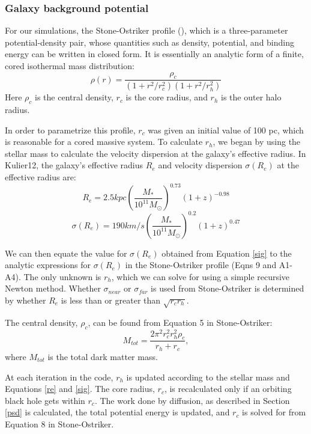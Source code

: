 \documentclass[english, apj]{emulateapj}
\begin{document}
\subsubsection{Galaxy background potential}
For our simulations, the Stone-Ostriker profile (\citet{2015ApJ...806L..28S}), which is a three-parameter potential-density pair, whose quantities such as density, potential, and binding energy can be written in closed form.  It is essentially an analytic form of a finite, cored isothermal mass distribution:
\begin{equation} \label{jerry}
\rho(r) = \frac{\rho_c}{(1+r^2/r_{c}^2)(1+r^2/r_{h}^2)}
\end{equation}
Here $\rho_c$ is the central density, $r_c$ is the core radius, and $r_h$ is the outer halo radius.

In order to parametrize this profile, $r_c$ was given an initial value of 100 pc, which is reasonable for a cored massive system.  To calculate $r_h$, we began by using the stellar mass to calculate the velocity dispersion at the galaxy's effective radius.  In Kulier12, the galaxy's effective radius $R_{e}$ and velocity dispersion $\sigma(R_e)$ at the effective radius are:
\begin{equation} \label{re}
R_{e} = 2.5 kpc\left(\frac{M_*}{10^{11}M_{\odot}}\right)^{0.73}(1+z)^{-0.98}
\end{equation}
\begin{equation} \label{sig}
\sigma(R_{e}) = 190km/s\left(\frac{M_{*}}{10^{11}M_{\odot}}\right)^{0.2}(1+z)^{0.47}
\end{equation}

We can then equate the value for $\sigma({R_e})$ obtained from Equation \ref{sig} to the analytic expressions for $\sigma(R_{e})$ in the Stone-Ostriker profile (Eqns 9 and A1-A4).  The only unknown is $r_h$, which we can solve for using a simple recursive Newton method.  Whether $\sigma_{near}$ or $\sigma_{far}$ is used from Stone-Ostriker is determined by whether $R_e$ is less than or greater than $\sqrt{r_c r_h}$.

The central density, $\rho_c$, can be found from Equation 5 in Stone-Ostriker:
\begin{equation} \label{rhoc}
M_{tot} = \frac{2\pi^2r_{c}^2r_{h}^2\rho_c}{r_h+r_c},
\end{equation}
where $M_{tot}$ is the total dark matter mass.

At each iteration in the code, $r_h$ is updated according to the stellar mass and Equations \ref{re} and \ref{sig}.  The core radius, $r_c$, is recalculated only if an orbiting black hole gets within $r_c$.  The work done by diffusion, as described in Section \ref{psd} is calculated, the total potential energy is updated, and $r_c$ is solved for from Equation 8 in Stone-Ostriker.
\end{document}
